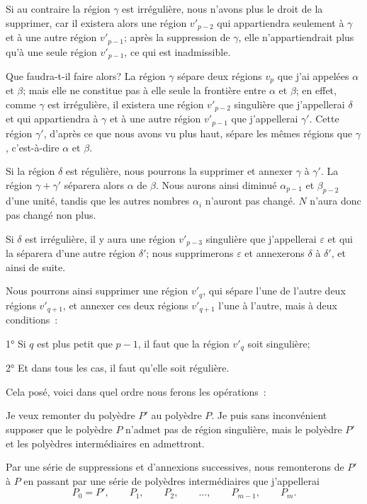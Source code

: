 \documentclass{article}
\begin{document}
Si au contraire la région $\gamma$ est irrégulière, nous n'avons plus le droit de la supprimer, car il existera alors une région $v'_{p-2}$ qui appartiendra seulement à $\gamma$ et à une autre région $v'_{p-1}$; après la suppression de $\gamma$, elle n'appartiendrait plus qu'à une seule région $v'_{p-1}$, ce qui est inadmissible.

Que faudra-t-il faire alors? La région $\gamma$ sépare deux régions $v_{p}$ que j'ai appelées $\alpha$ et $\beta$; mais elle ne constitue pas à elle seule la frontière entre $\alpha$ et $\beta$; en effet, comme $\gamma$ est irrégulière, il existera une région $v'_{p-2}$ singulière
que j'appellerai $\delta$ et qui appartiendra à $\gamma$ et à une autre région $v'_{p-1}$ que j'appellerai $\gamma'$. Cette région $\gamma'$, d'après ce que nous avons vu plus haut, sépare les mêmes régions que $\gamma$, c'est-à-dire $\alpha$ et $\beta$.

Si la région $\delta$ est régulière, nous pourrons la supprimer et annexer $\gamma$ à $\gamma'$. La région $\gamma + \gamma'$ séparera alors $\alpha$ de $\beta$. Nous aurons ainsi diminué $\alpha_{p-1}$ et $\beta_{p-2}$ d'une unité, tandis que les autres nombres $\alpha_{i}$ n'auront pas changé. $N$ n'aura donc pas changé non plus.

Si $\delta$ est irrégulière, il y aura une région $v'_{p-3}$ singulière que j'appellerai $\varepsilon$ et qui la séparera d'une autre région $\delta'$; nous supprimerons $\varepsilon$ et annexerons $\delta$ à $\delta'$, et ainsi de suite.

Nous pourrons ainsi supprimer une région $v'_{q}$, qui sépare l'une de l'autre deux régions $v'_{q+1}$, et annexer ces deux régions $v'_{q+1}$ l'une à l'autre, mais à deux conditions~:

1° Si $q$ est plus petit que $p - 1$, il faut que la région $v'_{q}$ soit singulière;

2° Et dans tous les cas, il faut qu'elle soit régulière.

Cela posé, voici dans quel ordre nous ferons les opérations~:

Je veux remonter du polyèdre $P'$ au polyèdre $P$. Je puis sans inconvénient supposer que le polyèdre $P$ n'admet pas de région singulière, mais le polyèdre $P'$ et les polyèdres intermédiaires en admettront.

Par une série de suppressions et d'annexions successives, nous remonterons de $P'$ à $P$ en passant par une série de polyèdres intermédiaires que j'appellerai
\[ P_{0} = P', \qquad P_{1}, \qquad P_{2}, \qquad \ldots, \qquad P_{m-1}, \qquad P_{m}. \]
\end{document}
